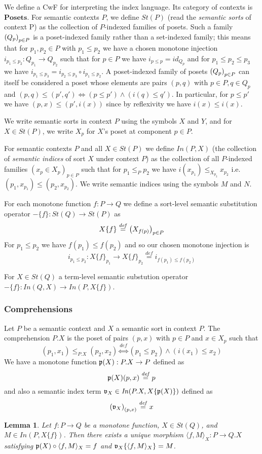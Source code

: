 \documentclass{article}
\newtheorem{lemma}{Lemma}
\newcommand{\mbf}{\mathbf}
\newcommand{\defeq}{\overset{\mathit{def}}{=}}
\newcommand{\defequiv}{\overset{\mathit{def}}{\Leftrightarrow}}
\newcommand{\fm}[2]{
\left(
\tiny
#1
\normalsize
\right)_{#2}
}
\begin{document}
We define a CwF for interpreting the index language. Its category of contexts is $\mbf{Posets}$. For semantic contexts $P$, we define $\mathit{St}(P)$ (read the \emph{semantic sorts} of context P) as the collection of $P$-indexed families of posets. Such a family $\fm{Q_p}{p \in P}$ is a poset-indexed family rather than a set-indexed family; this means that for $p_1,p_2 \in P$ with $p_1 \leq p_2$ we have a chosen monotone injection $i_{p_1 \leq p_2} : Q_{p_1} \to Q_{p_2}$ such that for $p \in P$ we have $i_{p \leq p} = \mathit{id}_{Q_p}$ and for $p_1 \leq p_2 \leq p_3$ we have $i_{p_1 \leq p_3} = i_{p_2 \leq p_3} \circ i_{p_1 \leq p_2}$.
A poset-indexed family of posets $\fm{Q_p}{p \in P}$ can itself be considered a poset whose elements are pairs $(p,q)$ with $p \in P, q \in Q_p$ and $(p,q) \leq (p',q') \Leftrightarrow (p \leq p') \wedge (i(q) \leq q')$. In particular, for $p \leq p'$ we have $(p, x) \leq (p', i(x))$ since by reflexivity we have $i(x) \leq i(x)$.

 We write semantic sorts in context $P$ using the symbols $X$ and $Y$, and for $X \in \mathit{St}(P)$, we write $X_p$ for $X$'s poset at component $p \in P$. 

For semantic contexts $P$ and all $X \in \mathit{St}(P)$ we define $\mathit{In}(P, X)$ (the collection of \emph{semantic indices} of sort $X$ under context $P$) as the collection of all $P$-indexed families $(x_p \in X_p)_{p \in P}$ such that for $p_1 \leq_P p_2$ we have $i(x_{p_1}) \leq_{X_{p_2}} x_{p_2}$ i.e. $(p_1, x_{p_1}) \leq (p_2, x_{p_2})$. We write semantic indices using the symbols $M$ and $N$.

For each monotone function $f : P \to Q$ we define a sort-level semantic substitution operator $- \{ f \} : \mathit{St}(Q) \to \mathit{St}(P)$ as 
$$X \{ f \} \defeq \fm{X_{f(p)}}{p \in P}$$
For $p_1 \leq p_2$ we have $f(p_1) \leq f(p_2)$ and so our chosen monotone injection is 
$$i_{p_1 \leq p_2} : X\{ f \}_{p_1} \to X \{ f \}_{p_2} \defeq i_{f(p_1) \leq f(p_2)}$$

For $X \in \mathit{St}(Q)$ a term-level semantic substution operator $- \{ f \} : \mathit{In}(Q,X) \to \mathit{In}(P, X \{ f \})$.

\subsubsection*{Comprehensions}

Let $P$ be a semantic context and $X$ a semantic sort in context $P$. The comprehension $P . X$ is the poset of pairs $(p,x)$ with $p \in P$ and $x \in X_p$ such that 
$$(p_1,x_1) \leq_{P.X} (p_2,x_2) \defequiv (p_1 \leq p_2) \wedge (i(x_1) \leq x_2)$$
We have a monotone function $\frak p(X) : P . X \to P$ defined as 
$$\frak p(X)(p,x) \defeq p$$
and also a semantic index term $\frak v_X \in \mathit{In}(P.X, X \{ \frak p(X) \})$ defined as
$$\fm{\frak v_X}{ (p,x) } \defeq x$$
\begin{lemma}
Let $f : P \to Q$ be a monotone function, $X \in \mathit{St}(Q)$, and $M \in \mathit{In}(P, X \{ f \})$. Then there exists a unique morphism $\langle f, M \rangle_X : P \to Q.X$ satisfying $\frak p(X) \circ \langle f, M \rangle_X = f$ and $\frak v_{X}\{ \langle f, M \rangle_X \} = M$.  
\end{lemma}
\end{document}
